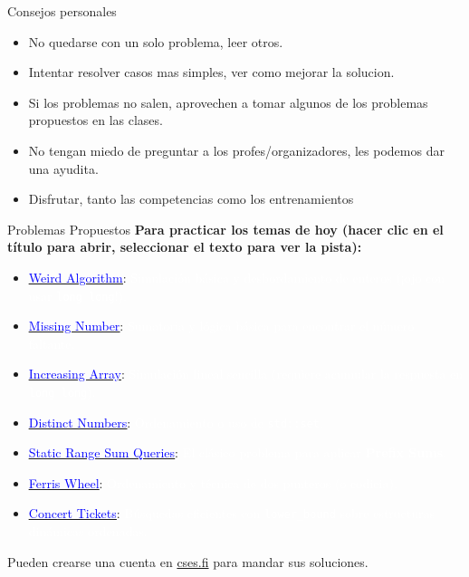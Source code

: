 \documentclass{beamer}
\begin{document}
\begin{frame}[fragile]{Consejos personales}
  \begin{itemize}
  \item No quedarse con un solo problema, leer otros.
  \item Intentar resolver casos mas simples, ver como mejorar la solucion.
  \item Si los problemas no salen, aprovechen a tomar algunos de los problemas propuestos en las clases.
  \item No tengan miedo de preguntar a los profes/organizadores, les podemos dar una ayudita.
  \item Disfrutar, tanto las competencias como los entrenamientos
  \end{itemize}
  
\end{frame}

\begin{frame}{Problemas Propuestos}
  \textbf{Para practicar los temas de hoy (hacer clic en el título para abrir, seleccionar el texto para ver la pista):}
  
  \begin{itemize}
    \item \href{https://cses.fi/problemset/task/1068}{\underline{\textcolor{blue}{Weird Algorithm}}}: \textcolor{white}{Simulación básica y desbordamiento de enteros (¡ojo con usar \texttt{long long}!).}
    \item \href{https://cses.fi/problemset/task/1083}{\underline{\textcolor{blue}{Missing Number}}}: \textcolor{white}{Sumatoria y lógica básica para encontrar el número faltante.}
    \item \href{https://cses.fi/problemset/task/1094}{\underline{\textcolor{blue}{Increasing Array}}}: \textcolor{white}{Simulación lineal sencilla (requiere acumular la respuesta en \texttt{long long}).}
    \item \href{https://cses.fi/problemset/task/1621}{\underline{\textcolor{blue}{Distinct Numbers}}}: \textcolor{white}{Ordenamiento o uso de \texttt{std::set}.}
    \item \href{https://cses.fi/problemset/task/1646}{\underline{\textcolor{blue}{Static Range Sum Queries}}}: \textcolor{white}{El clásico problema para aplicar \textbf{Prefix Sums}.}
    \item \href{https://cses.fi/problemset/task/1090}{\underline{\textcolor{blue}{Ferris Wheel}}}: \textcolor{white}{Ordenamiento y técnica de dos punteros (o codicia).}
    \item \href{https://cses.fi/problemset/task/1091}{\underline{\textcolor{blue}{Concert Tickets}}}: \textcolor{white}{Búsquedas eficientes con \texttt{lower\_bound} sobre estructuras dinámicas ordenadas.}
  \end{itemize}
  
  \vspace{0.2cm}
  Pueden crearse una cuenta en \href{https://cses.fi/}{cses.fi} para mandar sus soluciones.
\end{frame}
\end{document}
